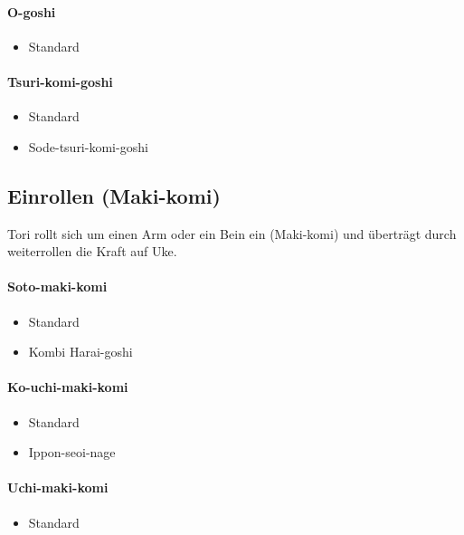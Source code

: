 \documentclass[justified, a4paper, notitlepage, captions=tableheading, nobib]{tufte-handout}
\begin{document}
\paragraph{O-goshi }
\label{sec:org19e5df3}
\begin{itemize}
\item Standard
\end{itemize}

\paragraph{Tsuri-komi-goshi}
\label{sec:orgb2bd55e}
\begin{itemize}
\item Standard
\item Sode-tsuri-komi-goshi
\end{itemize}

\subsection{Einrollen (Maki-komi) }
\label{sec:org3aad375}
Tori rollt sich um einen Arm oder ein Bein ein (Maki-komi) und überträgt durch weiterrollen die Kraft auf Uke.

\paragraph{Soto-maki-komi }
\label{sec:orgca1d336}
\begin{itemize}
\item Standard
\item Kombi Harai-goshi
\end{itemize}

\paragraph{Ko-uchi-maki-komi }
\label{sec:org2ca90b9}
\begin{itemize}
\item Standard
\item Ippon-seoi-nage
\end{itemize}

\paragraph{Uchi-maki-komi}
\label{sec:org23784e0}
\begin{itemize}
\item Standard
\end{itemize}
\end{document}
